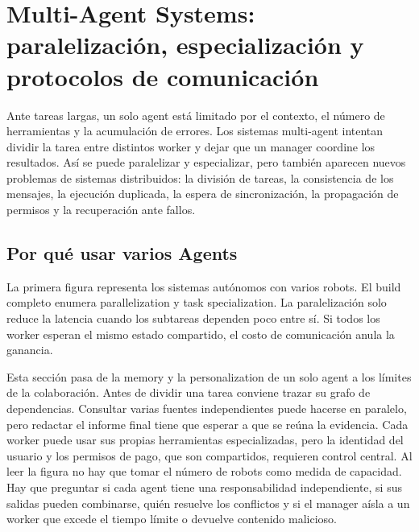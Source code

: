 \section{Multi-Agent Systems: paralelización, especialización y protocolos de comunicación}

Ante tareas largas, un solo agent está limitado por el contexto, el número de herramientas y la acumulación de errores. Los sistemas multi-agent intentan dividir la tarea entre distintos worker y dejar que un manager coordine los resultados. Así se puede paralelizar y especializar, pero también aparecen nuevos problemas de sistemas distribuidos: la división de tareas, la consistencia de los mensajes, la ejecución duplicada, la espera de sincronización, la propagación de permisos y la recuperación ante fallos.

\subsection{Por qué usar varios Agents}

La primera figura representa los sistemas autónomos con varios robots. El build completo enumera parallelization y task specialization. La paralelización solo reduce la latencia cuando los subtareas dependen poco entre sí. Si todos los worker esperan el mismo estado compartido, el costo de comunicación anula la ganancia.

Esta sección pasa de la memory y la personalization de un solo agent a los límites de la colaboración. Antes de dividir una tarea conviene trazar su grafo de dependencias. Consultar varias fuentes independientes puede hacerse en paralelo, pero redactar el informe final tiene que esperar a que se reúna la evidencia. Cada worker puede usar sus propias herramientas especializadas, pero la identidad del usuario y los permisos de pago, que son compartidos, requieren control central. Al leer la figura no hay que tomar el número de robots como medida de capacidad. Hay que preguntar si cada agent tiene una responsabilidad independiente, si sus salidas pueden combinarse, quién resuelve los conflictos y si el manager aísla a un worker que excede el tiempo límite o devuelve contenido malicioso.




